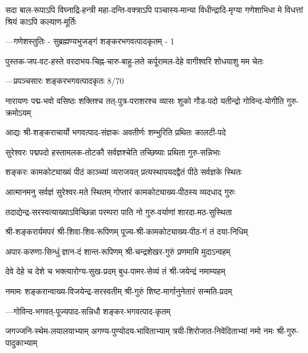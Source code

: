 
\newcommand{\creditline}[1]{\nobreak\hfill{—\normalsize #1}}


\twolineshloka
{सदा बाल-रूपाऽपि विघ्नाद्रि-हन्त्री महा-दन्ति-वक्त्राऽपि पञ्चास्य-मान्या}
{विधीन्द्रादि-मृग्या गणेशाभिधा मे विधत्तां श्रियं काऽपि कल्याण-मूर्तिः}

\creditline{गणेशस्तुतिः - सुब्रह्मण्यभुजङ्गं शङ्करभगवत्पादकृतम् - 1}

\twolineshloka
{पुस्तक-जप-वट-हस्ते वरदाभय-चिह्न-चारु-बाहु-लते}
{कर्पूरामल-देहे वागीश्वरि शोधयाशु मम चेतः}

\creditline{प्रपञ्चसारः शङ्करभगवत्पादकृतः 8/70}


\twolineshloka
{नारायणः पद्म-भवो वसिष्ठः शक्तिश्च तत्-पुत्र-पराशरश्च}
{व्यासः शुको गौड-पदो यतीन्द्रो गोविन्द-योगीति गुरु-क्रमोऽयम्}

\twolineshloka
{आद्यः श्री-शङ्कराचार्यो भगवत्पाद-संज्ञकः}
{अवतीर्णः शम्भुरिति प्रथितः कालटी-पदे}

\twolineshloka
{सुरेश्वरः पद्मपदो हस्तामलक-तोटकौ}
{सर्वज्ञश्चेति तच्छिष्याः प्रथिता गुरु-सन्निभाः}

\twolineshloka
{शङ्करः कामकोट्याख्यं पीठं काञ्च्यां व्यराजयत्}
{प्रत्यस्थापयदद्वैतं पीठे सर्वज्ञके स्थितः}

\twolineshloka
{आत्मानमनु सर्वज्ञं सुरेश्वर-मते स्थितम्}
{गोप्तारं कामकोट्याख्य-पीठस्य व्यदधाद् गुरुः}

\twolineshloka
{तदाद्येन्द्र-सरस्वत्याख्याऽविच्छिन्ना परम्परा}
{पाति नो गुरु-वर्याणां शारदा-मठ-सुस्थिता}

\twolineshloka
{श्री-शङ्करार्यमपरं श्री-शिवा-शिव-रूपिणम्}
{पूज्य-श्री-कामकोट्याख्य-पीठ-गं तं दया-निधिम्}

\twolineshloka
{अपार-करुणा-सिन्धुं ज्ञान-दं शान्त-रूपिणम्}
{श्री-चन्द्रशेखर-गुरुं प्रणमामि मुदाऽन्वहम्}

\twolineshloka
{देवे देहे च देशे च भक्त्यारोग्य-सुख-प्रदम्}
{बुध-पामर-सेव्यं तं श्री-जयेन्द्रं नमाम्यहम्}

\twolineshloka
{नमामः शङ्करान्वाख्य-विजयेन्द्र-सरस्वतीम्}
{श्री-गुरुं शिष्ट-मार्गानुनेतारं सन्मति-प्रदम्}



\creditline{गोविन्द-भगवत्-पूज्यपाद-सन्निधौ शङ्कर-भगवत्पाद-कृतम्}

\twolineshloka
{जगज्जनि-स्थेम-लयालयाभ्याम् अगण्य-पुण्योदय-भाविताभ्याम्}
{त्रयी-शिरोजात-निवेदिताभ्यां नमो नमः श्री-गुरु-पादुकाभ्याम्}

